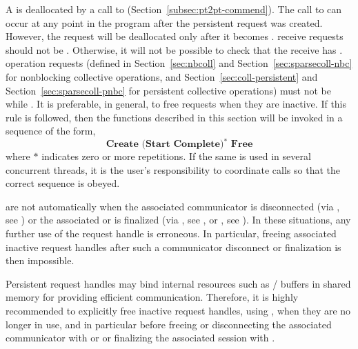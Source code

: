 A  is deallocated by a call to
(Section~\ref{subsec:pt2pt-commend}).
%
The call to  can occur at any point in the program
after the persistent request was created.  However, the request will be
deallocated only after it becomes .
 receive requests should not be . Otherwise, it will not be
possible to check that the receive has .
 operation requests
(defined in
Section~\ref{sec:nbcoll} and Section~\ref{sec:sparsecoll-nbc}
for nonblocking collective operations, and
Section~\ref{sec:coll-persistent} and Section~\ref{sec:sparsecoll-pnbc}
for persistent collective operations)
must not be  while .
It is preferable, in general, to free requests when they are inactive.  If this
rule is followed, then the functions
described in this section will be invoked
in a sequence of the form,
\[
\textbf{Create \ (Start \ Complete)$^*$ \ Free}
\]
where
$*$ indicates zero or more repetitions.
If the same  is used in several concurrent
threads, it is the user's responsibility to coordinate calls so that the
correct sequence is obeyed.

 are not automatically 
when the associated communicator is disconnected (via , see )
or the associated \wpm{} or \spm{} is finalized (via , see , or , see ).
In these situations, any further use of the request handle is erroneous.
In particular, freeing associated inactive request handles after such a communicator disconnect or finalization is then impossible.

\begin{users}
Persistent request handles may bind internal resources
such as \MPI/ buffers in shared memory for providing efficient communication.
Therefore, it is highly recommended to explicitly free inactive request handles,
using ,  when they are no longer in use,
and in particular before freeing or disconnecting the associated communicator
with  or 
or finalizing the associated session with .
\end{users}

